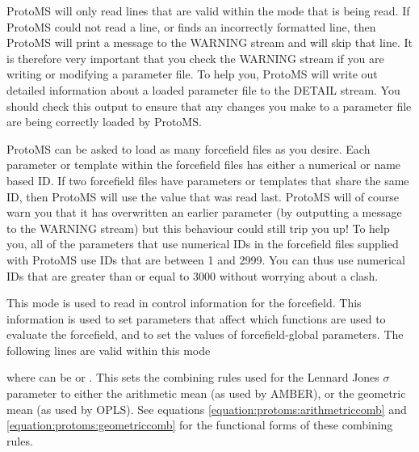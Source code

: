 \documentclass[letterpaper,10pt,english]{sphinxmanual}
\begin{document}
ProtoMS will only read lines that are valid within the mode that is being read. If ProtoMS could not read a line, or finds an incorrectly formatted line, then ProtoMS will print a message to the WARNING stream and will skip that line. It is therefore very important that you check the WARNING stream if you are writing or modifying a parameter file. To help you, ProtoMS will write out detailed information about a loaded parameter file to the DETAIL stream. You should check this output to ensure that any changes you make to a parameter file are being
correctly loaded by ProtoMS.

ProtoMS can be asked to load as many forcefield files as you desire. Each parameter or template within the forcefield files has either a numerical or name based ID. If two forcefield files have parameters or templates that share the same ID, then ProtoMS will use the value that was read last. ProtoMS will of course warn you that it has overwritten an earlier parameter (by outputting a message to the WARNING stream) but this behaviour could still trip you up! To help you, all of the parameters that use numerical IDs in the forcefield files supplied with ProtoMS use IDs that are between 1 and 2999. You can thus use numerical IDs that are greater than or equal to 3000 without worrying about a clash.

\ignorespaces 
{}

This mode is used to read in control information for the forcefield. This information is used to set parameters that affect which functions are used to evaluate the forcefield, and to set the values of forcefield-global parameters. The following lines are valid within this mode

%
\begin{sphinxVerbatim}[commandchars=\\\{\}]
 
\end{sphinxVerbatim}

where  can be  or . This sets the combining rules used for the Lennard Jones \(\sigma\) parameter to either the arithmetic mean (as used by AMBER), or the geometric mean (as used by OPLS). See equations \eqref{equation:protoms:arithmetriccomb} and \eqref{equation:protoms:geometriccomb} for the functional forms of these combining rules.

%
\begin{sphinxVerbatim}[commandchars=\\\{\}]
 
\end{sphinxVerbatim}
\end{document}
